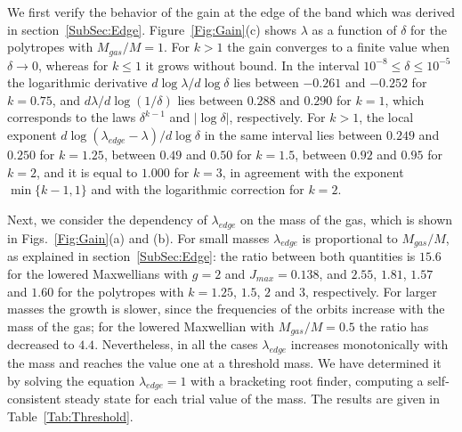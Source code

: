 We first verify the behavior of the gain at the edge of the band which was derived in section~\ref{SubSec:Edge}. Figure~\ref{Fig:Gain}(c) shows $\lambda$ as a function of $\delta$ for the polytropes with $M_{gas}/M = 1$. For $k > 1$ the gain converges to a finite value when $\delta\to 0$, whereas for $k\leq 1$ it grows without bound. In the interval $10^{-8}\leq \delta\leq 10^{-5}$ the logarithmic derivative $d\log\lambda/d\log\delta$ lies between $-0.261$ and $-0.252$ for $k = 0.75$, and $d\lambda/d\log(1/\delta)$ lies between $0.288$ and $0.290$ for $k = 1$, which corresponds to the laws $\delta^{k-1}$ and $|\log\delta|$, respectively. For $k > 1$, the local exponent $d\log(\lambda_{edge} - \lambda)/d\log\delta$ in the same interval lies between $0.249$ and $0.250$ for $k = 1.25$, between $0.49$ and $0.50$ for $k = 1.5$, between $0.92$ and $0.95$ for $k = 2$, and it is equal to $1.000$ for $k = 3$, in agreement with the exponent $\min\{ k-1,1 \}$ and with the logarithmic correction for $k = 2$.

Next, we consider the dependency of $\lambda_{edge}$ on the mass of the gas, which is shown in Figs.~\ref{Fig:Gain}(a) and (b). For small masses $\lambda_{edge}$ is proportional to $M_{gas}/M$, as explained in section~\ref{SubSec:Edge}: the ratio between both quantities is $15.6$ for the lowered Maxwellians with $g = 2$ and $J_{max} = 0.138$, and $2.55$, $1.81$, $1.57$ and $1.60$ for the polytropes with $k = 1.25$, $1.5$, $2$ and $3$, respectively. For larger masses the growth is slower, since the frequencies of the orbits increase with the mass of the gas; for the lowered Maxwellian with $M_{gas}/M = 0.5$ the ratio has decreased to $4.4$. Nevertheless, in all the cases $\lambda_{edge}$ increases monotonically with the mass and reaches the value one at a threshold mass. We have determined it by solving the equation $\lambda_{edge} = 1$ with a bracketing root finder, computing a self-consistent steady state for each trial value of the mass. The results are given in Table~\ref{Tab:Threshold}.

